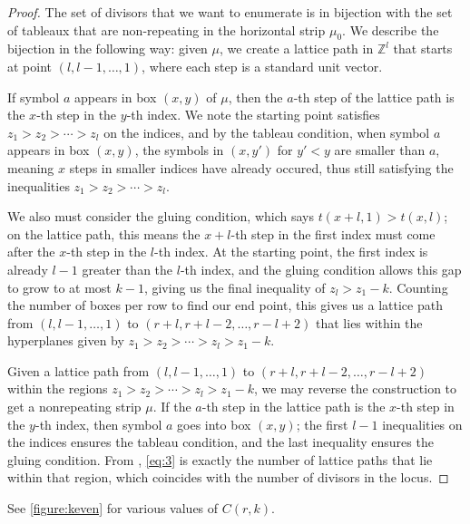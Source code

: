 \documentclass[11pt,reqno]{amsart}
\newcommand*{\Z}{\mathbb{Z}}
\theoremstyle{definition}
\theoremstyle{problem}
\theoremstyle{plain}
\theoremstyle{remark}
\theoremstyle{theorem}
\numberwithin{equation}{section}
\numberwithin{figure}{section}
\theoremstyle{definition}
\theoremstyle{problem}
\theoremstyle{plain}
\begin{document}
\begin{proof}
  The set of divisors that we want to enumerate is in bijection with the set of tableaux that are non-repeating in the horizontal strip $\mu_0$. We describe the bijection in the following way: given $\mu$, we create a lattice path in $\Z^l$ that starts at point $(l,l-1,\ldots,1)$, where each step is a standard unit vector. 

  If symbol $a$ appears in box $(x,y)$ of $\mu$, then the $a$-th step of the lattice path is the $x$-th step in the $y$-th index. We note the starting point satisfies $z_1>z_2>\cdots>z_l$ on the indices, and by the tableau condition, when symbol $a$ appears in box $(x,y)$, the symbols in $(x,y')$ for $y'<y$ are smaller than $a$, meaning $x$ steps in smaller indices have already occured, thus still satisfying the inequalities $z_1>z_2>\cdots>z_l$.

  We also must consider the gluing condition, which says $t(x+l,1)>t(x,l)$; on the lattice path, this means the $x+l$-th step in the first index must come after the $x$-th step in the $l$-th index. At the starting point, the first index is already $l-1$ greater than the $l$-th index, and the gluing condition allows this gap to grow to at most $k-1$, giving us the final inequality of $z_l>z_1-k$. Counting the number of boxes per row to find our end point, this gives us a lattice path from $(l,l-1,\ldots,1)$ to $(r+l,r+l-2,\ldots,r-l+2)$ that lies within the hyperplanes given by $z_1>z_2>\cdots>z_l>z_1-k$.

  Given a lattice path from $(l,l-1,\ldots,1)$ to $(r+l,r+l-2,\ldots,r-l+2)$ within the regions $z_1>z_2>\cdots>z_l>z_1-k$, we may reverse the construction to get a nonrepeating strip $\mu$. If the $a$-th step in the lattice path is the $x$-th step in the $y$-th index, then symbol $a$ goes into box $(x,y)$; the first $l-1$ inequalities on the indices ensures the tableau condition, and the last inequality ensures the gluing condition. From \cite[Theorem~10.18.6]{bona2015handbook}, \cref{eq:3} is exactly the number of lattice paths that lie within that region, which coincides with the number of divisors in the locus. 
\end{proof}

See \cref{figure:keven} for various values of $C(r,k)$.
\end{document}
